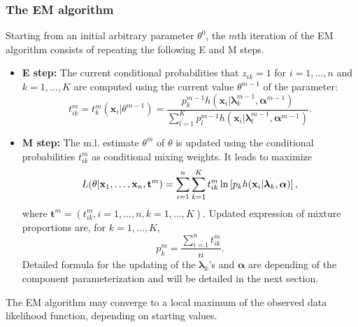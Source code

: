 \documentclass[a4paper,10pt]{article}
\newcommand{\bx}{\mathbf{x}}
\newcommand{\bt}{\mathbf{t}}
\newcommand{\balpha}{\boldsymbol{\alpha}}
\newcommand{\blambda}{\boldsymbol{\lambda}}
\begin{document}
\subsubsection{The EM algorithm}

Starting from an initial arbitrary parameter $\theta^0$, the $m$th iteration of the EM
algorithm consists of repeating the following E and M steps.
\begin{itemize}
\item {\bf E step:} The current conditional probabilities that $z_{ik}=1$ for $i=1,\ldots,n$
  and $k=1,\ldots,K$ are computed using the current value $\theta^{m-1}$ of the parameter:
  \begin{equation}
    \label{eq:condi}
    t^m_{ik}=t^m_k(\bx_i|\theta^{m-1})=\frac{ p^{m-1}_kh (\bx_i|{\blambda^{m-1}_k},\balpha^{m-1} )}
    {\sum_{l=1}^K  p^{m-1}_l h(\bx_i|\blambda^{m-1}_l,\balpha^{m-1})}.
  \end{equation}
\item {\bf M step:} The m.l. estimate $\theta^m$ of $\theta$ is updated using the conditional
  probabilities $t^m_{ik}$ as conditional mixing weights. It leads to maximize
  \begin{equation} \label{eq:mStepEM}
    L(\theta| {\bx}_{1},\ldots,{\bx}_{n}, {\bt}^m)
      =\sum_{i=1}^{n}\sum_{k=1}^{K} t_{ik}^m \ln \left [p_{k} h({\bf x}_{i}|\blambda_{k},\balpha)\right],
  \end{equation}
  where ${\bt}^m=(t_{ik}^m, i=1,\ldots,n, k=1,\ldots,K)$. Updated expression of mixture
  proportions are, for $k=1,\ldots,K$,
  \begin{equation}
    p_k^m=\frac{\sum_{i=1}^n t^m_{ik}}{n}.
  \end{equation}
  Detailed formula for the updating of the $\blambda_k$'s and $\balpha$ are depending of the component
  parameterization and will be detailed in the next section.
\end{itemize}
The EM algorithm may converge to a local maximum of the observed data likelihood function, depending on starting
values.
\end{document}
